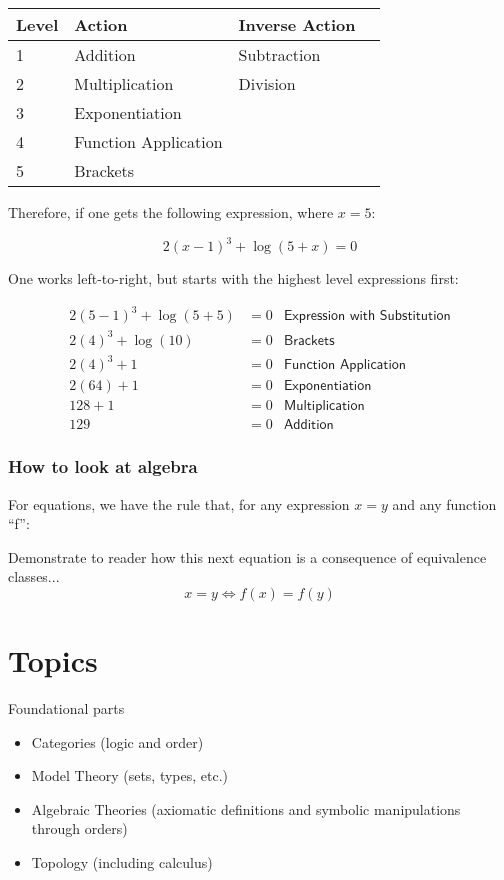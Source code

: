 \documentclass[11pt,twoside,letterpaper,fleqn,parskip=full]{book}
\begin{document}
\begin{tabular}{|l|l|l|l|} \hline
Level & Action & Inverse Action \\ \hline
1 & Addition & Subtraction \\ \hline
2 & Multiplication & Division \\ \hline
3 & Exponentiation & \\ \hline
4 & Function Application & \\ \hline
5 & Brackets & \\ \hline
\end{tabular}

Therefore, if one gets the following expression, where $x=5$:

\begin{equation}
2(x-1)^3+\log(5+x)=0
\end{equation}

One works left-to-right, but starts with the highest level expressions first:

\begin{equation}
\begin{aligned}
2(5-1)^3+\log(5+5)& = 0 & \textsf{Expression with Substitution} \\
2(4)^3+\log(10)&=0 &\textsf{Brackets} \\
2(4)^3+1&=0&\textsf{Function Application} \\
2(64)+1&=0&\textsf{Exponentiation} \\
128+1&=0&\textsf{Multiplication} \\
129&=0&\textsf{Addition}
\end{aligned}
\end{equation}

\section{How to look at algebra}
For equations, we have the rule that, for any expression $x=y$ and any function ``f'':


Demonstrate to reader how this next equation is a consequence of equivalence classes...
\begin{equation}
x=y \Leftrightarrow f(x)=f(y)
\end{equation}

\part{Topics}
Foundational parts
\begin{itemize}
    \item Categories (logic and order)
    \item Model Theory (sets, types, etc.)
    \item Algebraic Theories (axiomatic definitions and symbolic manipulations through orders)
    \item Topology (including calculus)
\end{itemize}
\end{document}
